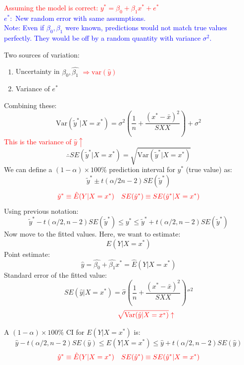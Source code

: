 \documentclass[14pt]{extarticle}
\begin{document}
\noindent
\textcolor{red}{Assuming the model is correct: $y^* = \beta_0 + \beta_1 x^* + e^* $}\\
\textcolor{blue}{$e^* : $ New random error with same assumptions.}\\
\textcolor{blue}{Note: Even if $\beta_0, \beta_1$ were known, predictions would not match true values perfectly. They would be off by a random quantity with variance $\sigma^2$.}

\noindent
Two sources of variation:
\begin{enumerate}
    \item Uncertainty in $\hat{\beta_0}, \hat{\beta_1}$ \textcolor{red}{$\Rightarrow \text{var}(\hat{y})$}
    \item Variance of $e^*$
\end{enumerate}
Combining these:
\[
\text{Var}(\tilde{y}^* | X = x^*) = \sigma^2 \left( \frac{1}{n} + \frac{(x^* - \bar{x})^2}{SXX} \right) + \sigma^2
\]
\textcolor{red}{\quad \quad \quad \quad \quad \quad \quad \quad \quad \quad \quad \quad This is the variance of $\hat{y} \uparrow$}
\[
\therefore SE(\tilde{y}^* | X = x^*) = \sqrt{\text{Var}(\tilde{y}^* | X = x^*)}
\]
We can define a $(1-\alpha) \times 100\%$ prediction interval for $y^*$ (true value) as:
\[
\tilde{y}^* \pm t\left(\alpha/2 n-2\right) SE(\tilde{y}^*)
\]
\[
\textcolor{red}{\tilde{y}^* \equiv \hat{E}(Y | X = x^*)} \quad \textcolor{red}{SE(\tilde{y}^*) \equiv SE(\tilde{y}^*| X = x^*)}
\]
Using previous notation:
\[
\tilde{y}^* - t\left(\alpha/2, n-2\right) SE(\tilde{y}^*) \leq y^* \leq \tilde{y}^* + t\left(\alpha/2, n-2\right) SE(\tilde{y}^*)
\]
Now move to the fitted values. Here, we want to estimate:
\[
E(Y | X = x^*)
\]
Point estimate:
\[
\hat{y} = \hat{\beta_0} + \hat{\beta_1} x^* = \hat{E}(Y | X = x^*)
\]
Standard error of the fitted value:
\[
SE(\hat{y} | X = x^*) = \hat{\sigma} \left( \frac{1}{n} + \frac{(x^* - \bar{x})^2}{SXX} \right)''^{2}
\]
\[
\quad \quad \quad \quad \quad \textcolor{red}{\sqrt{\text{Var}(\hat{y} | X = x^*)} \uparrow}
\]

A $(1-\alpha) \times 100\%$ CI for $E(Y | X = x^*)$ is:
\[
\hat{y} - t\left(\alpha/2, n-2\right) SE(\hat{y}) \leq E(Y | X = x^*) \leq \hat{y} + t\left(\alpha/2, n-2\right) SE(\hat{y})
\]
\[
\textcolor{red}{\hat{y}^* \equiv \hat{E}(Y | X = x^*)} \quad \textcolor{red}{SE(\hat{y}^*) \equiv SE(\hat{y}^*| X = x^*)}
\]
\end{document}
